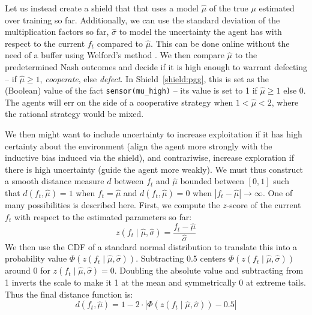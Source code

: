 Let us instead create a shield that that uses a model $\hat{\mu}$ of the true $\mu$ estimated over training so far. Additionally, we can use the standard deviation of the multiplication factors so far, $\hat{\sigma}$ to model the uncertainty the agent has with respect to the current $f_t$ compared to $\hat{\mu}$. This can be done online without the need of a buffer using Welford's method \citep{welford1962note}. 
We then compare $\hat{\mu}$ to the predetermined Nash outcomes and decide if it is high enough to warrant defecting -- if $\hat{\mu}\geq1$, \textit{cooperate}, else \textit{defect}. In Shield~\ref{shield:pgg}, this is set as the (Boolean) value of the fact \texttt{sensor(mu\_high)} -- its value is set to 1 if $\hat{\mu}\geq1$ else 0. The agents will err on the side of a cooperative strategy when $1<\hat{\mu}<2$, where the rational strategy would be mixed.

We then might want to include uncertainty to increase exploitation if it has high certainty about the environment (align the agent more strongly with the inductive bias induced via the shield), and contrariwise, increase exploration if there is high uncertainty (guide the agent more weakly). We must thus construct a smooth distance measure $d$ between $f_t$ and $\hat{\mu}$ bounded between $[0,1]$ such that $d(f_t,\hat{\mu})=1$ when $f_t=\hat\mu$ and $d(f_t,\hat{\mu})=0$ when $|f_t-\hat{\mu}|\rightarrow\infty$. One of many possibilities is described here. First, we compute the $z$-score of the current $f_t$ with respect to the estimated parameters so far:
\begin{equation}
    z(f_t\mid \hat{\mu}, \hat{\sigma}) = \frac{f_t-\hat{\mu}}{\hat{\sigma}}
\end{equation}
We then use the CDF of a standard normal distribution to translate this into a probability value $\Phi(z(f_t\mid \hat{\mu}, \hat{\sigma}))$. Subtracting 0.5 centers $\Phi(z(f_t\mid\hat{\mu}, \hat{\sigma}))$ around 0 for $z(f_t\mid \hat{\mu}, \hat{\sigma})=0$. Doubling the absolute value and subtracting from 1 inverts the scale to make it 1 at the mean and symmetrically 0 at extreme tails. Thus the final distance function is:
\begin{equation}
    d(f_t,\hat{\mu}) = 1-2\cdot\left|\Phi(z(f_t\mid \hat{\mu}, \hat{\sigma}))-0.5\right|
\end{equation}


